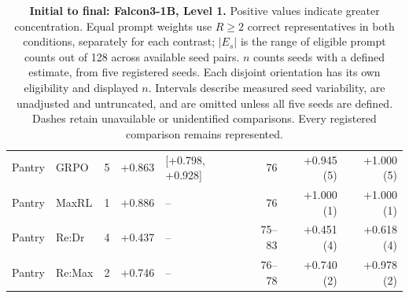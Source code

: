\begin{table}[!htbp]
\begin{tabular}{@{}llcrlrrr@{}}
Pantry & GRPO & 5 & +0.863 & [+0.798, +0.928] & 76 & +0.945 (5) & +1.000 (5) \\
Pantry & MaxRL & 1 & +0.886 & -- & 76 & +1.000 (1) & +1.000 (1) \\
Pantry & Re:Dr & 4 & +0.437 & -- & 75--83 & +0.451 (4) & +0.618 (4) \\
Pantry & Re:Max & 2 & +0.746 & -- & 76--78 & +0.740 (2) & +0.978 (2) \\
\bottomrule
\end{tabular}
\caption{\textbf{Initial to final: Falcon3-1B, Level 1.} Positive values indicate greater concentration. Equal prompt weights use $R\ge2$ correct representatives in both conditions, separately for each contrast; $|E_s|$ is the range of eligible prompt counts out of 128 across available seed pairs. $n$ counts seeds with a defined estimate, from five registered seeds. Each disjoint orientation has its own eligibility and displayed $n$. Intervals describe measured seed variability, are unadjusted and untruncated, and are omitted unless all five seeds are defined. Dashes retain unavailable or unidentified comparisons. Every registered comparison remains represented.}
\end{table}

